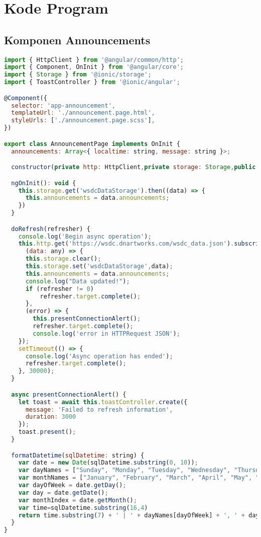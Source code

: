 \chapter{Kode Program}
\label{lamp:A}

\section{Komponen Announcements} 
\label{sec:lampiranKomponenAnnouncements}

\begin{lstlisting}[language=JavaScript, label={lst:announcements.page.ts}, caption=annoncement.page.ts]
import { HttpClient } from '@angular/common/http';
import { Component, OnInit } from '@angular/core';
import { Storage } from '@ionic/storage';
import { ToastController } from '@ionic/angular';

@Component({
  selector: 'app-announcement',
  templateUrl: './announcement.page.html',
  styleUrls: ['./announcement.page.scss'],
})

export class AnnouncementPage implements OnInit {
  announcements: Array<{ localtime: string, message: string }>;

  constructor(private http: HttpClient,private storage: Storage,public toastController: ToastController) { }

  ngOnInit(): void {
    this.storage.get('wsdcDataStorage').then((data) => {
      this.announcements = data.announcements;
    })
  }

  doRefresh(refresher) {
    console.log('Begin async operation');
    this.http.get('https://wsdc.dnartworks.com/wsdc_data.json').subscribe(
      (data: any) => {
      this.storage.clear();
      this.storage.set('wsdcDataStorage',data);
      this.announcements = data.announcements;
      console.log("Data updated!"); 
      if (refresher != 0)
          refresher.target.complete();
      },
      (error) => {
        this.presentConnectionAlert();
        refresher.target.complete();
        console.log('error in HTTPRequest JSON');
    });
    setTimeout(() => {
      console.log('Async operation has ended');
      refresher.target.complete();
    }, 30000);
  }

  async presentConnectionAlert() {
    let toast = await this.toastController.create({
      message: 'Failed to refresh information',
      duration: 3000
    });
    toast.present();
  }

  formatDatetime(sqlDatetime: string) {
    var date = new Date(sqlDatetime.substring(0, 10));
    var dayNames = ["Sunday", "Monday", "Tuesday", "Wednesday", "Thursday", "Friday", "Saturday"];
    var monthNames = ["January", "February", "March", "April", "May", "June", "July", "August", "September", "October", "November", "December"];
    var dayOfWeek = date.getDay();
    var day = date.getDate();
    var monthIndex = date.getMonth();
    var time=sqlDatetime.substring(16,4)
    return time.substring(7) + ' | ' + dayNames[dayOfWeek] + ', ' + day + ' ' + monthNames[monthIndex];
  }
}

\end{lstlisting} 

